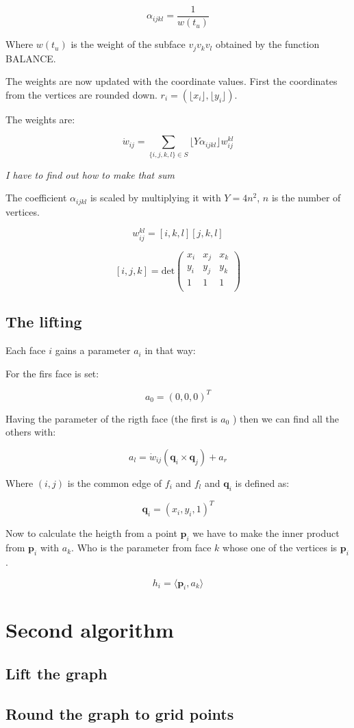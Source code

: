 \documentclass[10pt,a4paper]{article}
\begin{document}
$$\alpha_{ijkl} = \frac{1}{w(t_u)}$$

Where $w(t_u)$ is the weight of the subface $v_jv_kv_l$ obtained by the function BALANCE.

The weights are now updated with the coordinate values. First the coordinates from the vertices are rounded down. $r_i = (\lfloor x_i \rfloor, \lfloor y_i\rfloor)$.

The weights are:

$$\dot{w}_{ij}= \sum_{\{i,j,k,l\}\in S} \lfloor Y \alpha_{ijkl}\rfloor w^{kl}_{ij}$$   

\textit{I have to find out how to make that sum}

The coefficient $\alpha_{ijkl}$ is scaled by multiplying it with $Y = 4 n^2$, $n$ is the number of vertices.


$$w^{kl}_{ij}= [i,k,l][j,k,l]$$

$$
[i,j,k]= \text{det}
 \begin{pmatrix}
  x_i & x_j & x_k\\
  y_i & y_j & y_k\\
  1	  & 1   & 1  \\
 \end{pmatrix}
$$

\subsection{The lifting}

Each face $i$ gains a parameter $a_i$ in that way:

For the firs face is set:

$$a_0 = (0,0,0)^T$$   

Having the parameter of the rigth face (the first is $a_0$ ) then we can find all the others with:

$$a_l= \dot{w}_{ij}(\mathbf{q}_i\times\mathbf{q}_j)+a_r$$

Where $(i,j)$ is the common edge of $f_i$ and $f_l$ and $\mathbf{q}_i$ is defined as:

$$\mathbf{q}_i = (x_i,y_i,1)^T$$

Now to calculate the heigth from a point $\mathbf{p}_i$ we have to make the inner product from $\mathbf{p}_i$ with $a_k$. Who is the parameter from face $k$ whose one of the vertices is $\mathbf{p}_i$.

$$h_i = \langle \mathbf{p}_i, a_k\rangle$$

\section{Second algorithm}

\subsection{Lift the graph} 

\subsection{Round the graph to grid points}
\end{document}
